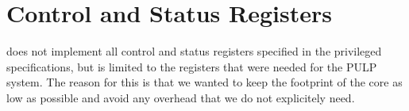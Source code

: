\chapter{Control and Status Registers}

\rvcore does not implement all control and status  registers specified in the
\riscv privileged specifications, but is limited to the registers that were
needed for the PULP system.
The reason for this is that we wanted to keep the footprint of the core as low
as possible and avoid any overhead that we do not explicitely need.
